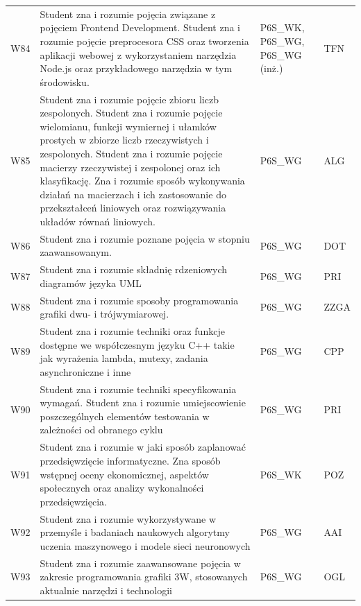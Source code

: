 \documentclass[12pt,a4paper]{article}
\begin{document}
{\begin{longtable}{m{1cm}m{8.8cm}m{2.1cm}m{2.5cm}}
\rowcolor{tableRowAlt} W84 & Student zna i rozumie pojęcia związane z pojęciem Frontend Development. Student zna i rozumie pojęcie preprocesora CSS oraz tworzenia aplikacji webowej z wykorzystaniem narzędzia Node.js oraz przykładowego narzędzia w tym środowisku. & {\scriptsize P6S\_WK, P6S\_WG, P6S\_WG {\scriptsize (inż.)}} & {\scriptsize TFN} \\
\rowcolor{tableRowLight} W85 & Student zna i rozumie pojęcie zbioru liczb zespolonych. Student zna i rozumie pojęcie wielomianu, funkcji wymiernej i ułamków prostych w zbiorze liczb rzeczywistych i zespolonych. Student zna i rozumie pojęcie macierzy rzeczywistej i zespolonej oraz ich klasyfikację. Zna i rozumie sposób wykonywania działań na macierzach i ich zastosowanie do przekształceń liniowych oraz rozwiązywania układów równań liniowych. & {\scriptsize P6S\_WG} & {\scriptsize ALG} \\
\rowcolor{tableRowAlt} W86 & Student zna i rozumie poznane pojęcia w stopniu zaawansowanym. & {\scriptsize P6S\_WG} & {\scriptsize DOT} \\
\rowcolor{tableRowLight} W87 & Student zna i rozumie składnię rdzeniowych diagramów języka UML & {\scriptsize P6S\_WG} & {\scriptsize PRI} \\
\rowcolor{tableRowAlt} W88 & Student zna i rozumie sposoby programowania grafiki dwu- i trójwymiarowej. & {\scriptsize P6S\_WG} & {\scriptsize ZZGA} \\
\rowcolor{tableRowLight} W89 & Student zna i rozumie techniki oraz funkcje dostępne we współczesnym języku C++ takie jak wyrażenia lambda, mutexy, zadania asynchroniczne i inne & {\scriptsize P6S\_WG} & {\scriptsize CPP} \\
\rowcolor{tableRowAlt} W90 & Student zna i rozumie techniki specyfikowania wymagań. Student zna i rozumie umiejscowienie poszczególnych elementów testowania w zależności od obranego cyklu & {\scriptsize P6S\_WG} & {\scriptsize PRI} \\
\rowcolor{tableRowLight} W91 & Student zna i rozumie w jaki sposób zaplanować przedsięwzięcie informatyczne. Zna sposób wstępnej oceny ekonomicznej, aspektów społecznych oraz analizy wykonalności przedsięwzięcia. & {\scriptsize P6S\_WK} & {\scriptsize POZ} \\
\rowcolor{tableRowAlt} W92 & Student zna i rozumie wykorzystywane w przemyśle i badaniach naukowych algorytmy uczenia maszynowego i modele sieci neuronowych & {\scriptsize P6S\_WG} & {\scriptsize AAI} \\
\rowcolor{tableRowLight} W93 & Student zna i rozumie zaawansowane pojęcia w zakresie programowania grafiki 3W, stosowanych aktualnie narzędzi i technologii & {\scriptsize P6S\_WG} & {\scriptsize OGL} \\

\end{longtable}}
\end{document}
